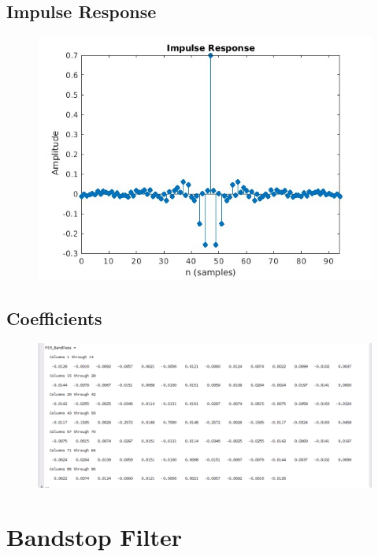 \documentclass{article}
\begin{document}
\subsection{Impulse Response}
\begin{figure}[H]
\hspace*{-2.5cm}
    \centering
    \includegraphics[width=1.5\linewidth, height=0.65\textheight]{IR_BP.jpg}
    \label{fig:my_label}
\end{figure}

\subsection{Coefficients}
\begin{figure}[H]
\hspace*{-2.5cm}
    \centering
    \includegraphics[width=1.5\linewidth, height=0.55\textheight]{coeff_BP.png}
    \label{fig:my_label}
\end{figure}


\newpage
\section{\textbf{Bandstop Filter}}
\end{document}
